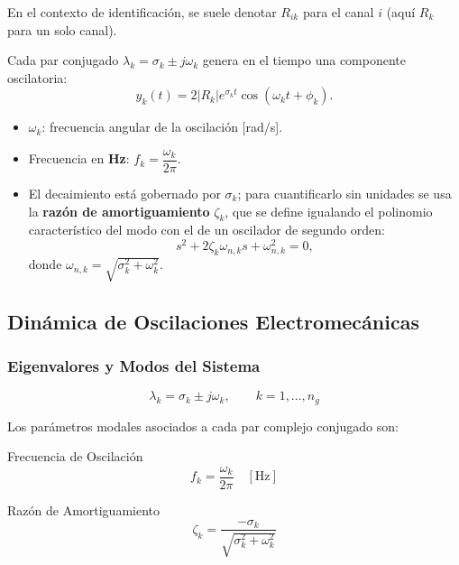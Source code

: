 En el contexto de identificación, se suele denotar $R_{ik}$ para el canal $i$ (aquí $R_k$ para un solo canal).

Cada par conjugado $\lambda_k = \sigma_k \pm j\omega_k$ genera en el tiempo
una componente oscilatoria:
\[
y_k(t) = 2|R_k| e^{\sigma_k t} \cos(\omega_k t + \phi_k).
\]
\begin{itemize}
    \item $\omega_k$: frecuencia angular de la oscilación [rad/s].
    \item Frecuencia en \textbf{Hz}: $f_k = \dfrac{\omega_k}{2\pi}$.
    \item El decaimiento está gobernado por $\sigma_k$; para cuantificarlo
          sin unidades se usa la \textbf{razón de amortiguamiento} $\zeta_k$,
          que se define igualando el polinomio característico del modo con
          el de un oscilador de segundo orden:
          \[
          s^2 + 2\zeta_k\omega_{n,k} s + \omega_{n,k}^2 = 0,
          \]
          donde $\omega_{n,k} = \sqrt{\sigma_k^2+\omega_k^2}$.
          
\end{itemize}


\subsection{Dinámica de Oscilaciones Electromecánicas}
\subsubsection{Eigenvalores y Modos del Sistema}


\begin{equation}
    \lambda_k = \sigma_k \pm j\omega_k, \qquad k = 1,\ldots,n_g
    \label{eq:eigenvalue}
\end{equation}

Los parámetros modales asociados a cada par complejo conjugado son:

\begin{block}{Frecuencia de Oscilación}
\begin{equation}
    f_k = \frac{\omega_k}{2\pi} \quad [\text{Hz}]
    \label{eq:freq}
\end{equation}
\end{block}
\begin{block}{Razón de Amortiguamiento}
\begin{equation}
    \zeta_k = \frac{-\sigma_k}{\sqrt{\sigma_k^2 + \omega_k^2}}
    \label{eq:damp}
\end{equation}
\end{block}

